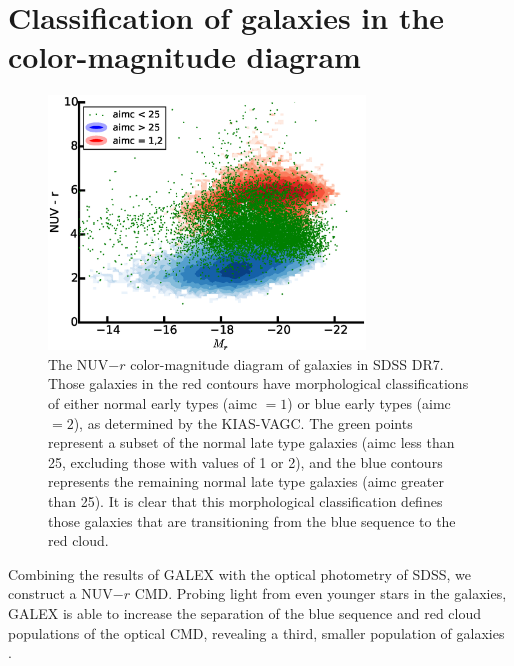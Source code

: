 

\section[Classifying the CMD]{Classification of galaxies in the color-magnitude diagram}

\begin{figure}
    \includegraphics[width=0.75\textwidth]{Images/GV/NUVr_CMD_3pop_scatter}
    \caption[NUV-$r$ color-magnitude diagram of SDSS galaxies]{The NUV$-r$ 
    color-magnitude diagram of galaxies in SDSS DR7.  Those galaxies in the red 
    contours have morphological classifications of either normal early types 
    (aimc $=1$) or blue early types (aimc $=2$), as determined by the KIAS-VAGC.  
    The green points represent a subset of the normal late type galaxies (aimc 
    less than 25, excluding those with values of 1 or 2), and the blue contours 
    represents the remaining normal late type galaxies (aimc greater than 25).  
    It is clear that this morphological classification defines those galaxies 
    that are transitioning from the blue sequence to the red cloud.}
    \label{fig:NUVr_CMD}
\end{figure}

Combining the results of GALEX with the optical photometry of SDSS, we construct 
a NUV$-r$ CMD.  Probing light from even younger stars in the galaxies, GALEX is 
able to increase the separation of the blue sequence and red cloud populations 
of the optical CMD, revealing a third, smaller population of galaxies 
\citep{Wyder07}.

